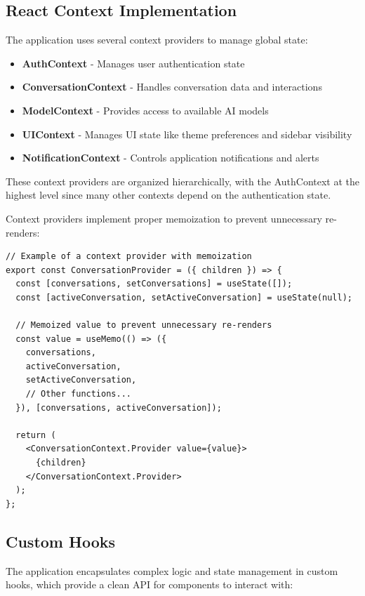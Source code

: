 \subsection{React Context Implementation}

The application uses several context providers to manage global state:

\begin{itemize}
  \item \textbf{AuthContext} - Manages user authentication state
  \item \textbf{ConversationContext} - Handles conversation data and interactions
  \item \textbf{ModelContext} - Provides access to available AI models
  \item \textbf{UIContext} - Manages UI state like theme preferences and sidebar visibility
  \item \textbf{NotificationContext} - Controls application notifications and alerts
\end{itemize}

These context providers are organized hierarchically, with the AuthContext at the highest level since many other contexts depend on the authentication state.

Context providers implement proper memoization to prevent unnecessary re-renders:

\begin{verbatim}
// Example of a context provider with memoization
export const ConversationProvider = ({ children }) => {
  const [conversations, setConversations] = useState([]);
  const [activeConversation, setActiveConversation] = useState(null);
  
  // Memoized value to prevent unnecessary re-renders
  const value = useMemo(() => ({
    conversations,
    activeConversation,
    setActiveConversation,
    // Other functions...
  }), [conversations, activeConversation]);
  
  return (
    <ConversationContext.Provider value={value}>
      {children}
    </ConversationContext.Provider>
  );
};
\end{verbatim}

\subsection{Custom Hooks}

The application encapsulates complex logic and state management in custom hooks, which provide a clean API for components to interact with:

